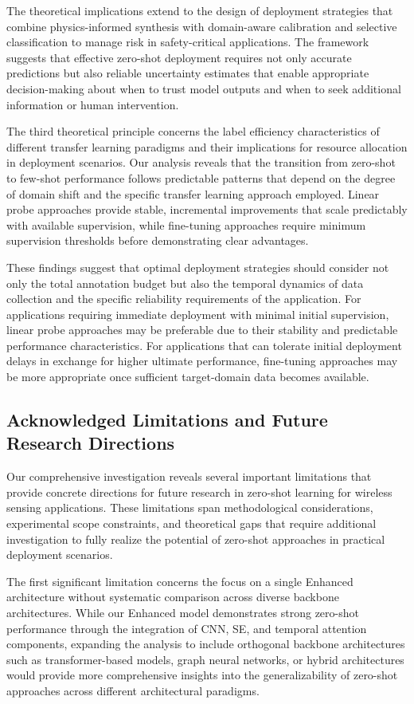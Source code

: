 \documentclass[journal]{IEEEtran}
\begin{document}
The theoretical implications extend to the design of deployment strategies that combine physics-informed synthesis with domain-aware calibration and selective classification to manage risk in safety-critical applications. The framework suggests that effective zero-shot deployment requires not only accurate predictions but also reliable uncertainty estimates that enable appropriate decision-making about when to trust model outputs and when to seek additional information or human intervention.

The third theoretical principle concerns the label efficiency characteristics of different transfer learning paradigms and their implications for resource allocation in deployment scenarios. Our analysis reveals that the transition from zero-shot to few-shot performance follows predictable patterns that depend on the degree of domain shift and the specific transfer learning approach employed. Linear probe approaches provide stable, incremental improvements that scale predictably with available supervision, while fine-tuning approaches require minimum supervision thresholds before demonstrating clear advantages.

These findings suggest that optimal deployment strategies should consider not only the total annotation budget but also the temporal dynamics of data collection and the specific reliability requirements of the application. For applications requiring immediate deployment with minimal initial supervision, linear probe approaches may be preferable due to their stability and predictable performance characteristics. For applications that can tolerate initial deployment delays in exchange for higher ultimate performance, fine-tuning approaches may be more appropriate once sufficient target-domain data becomes available.

\subsection{Acknowledged Limitations and Future Research Directions}

Our comprehensive investigation reveals several important limitations that provide concrete directions for future research in zero-shot learning for wireless sensing applications. These limitations span methodological considerations, experimental scope constraints, and theoretical gaps that require additional investigation to fully realize the potential of zero-shot approaches in practical deployment scenarios.

The first significant limitation concerns the focus on a single Enhanced architecture without systematic comparison across diverse backbone architectures. While our Enhanced model demonstrates strong zero-shot performance through the integration of CNN, SE, and temporal attention components, expanding the analysis to include orthogonal backbone architectures such as transformer-based models, graph neural networks, or hybrid architectures would provide more comprehensive insights into the generalizability of zero-shot approaches across different architectural paradigms.
\end{document}
